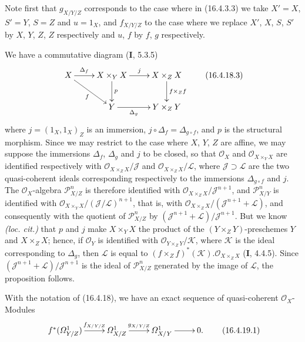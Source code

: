 Note first that $g_{X/Y/Z}$ corresponds to the case where in (16.4.3.3) we take
$X'=X$, $S'=Y$, $S=Z$ and $u=1_X$, and $f_{X/Y/Z}$ to the case where we replace
$X'$, $X$, $S$, $S'$ by $X$, $Y$, $Z$, $Z$ respectively and $u$, $f$ by
$f$, $g$ respectively.

We have a commutative diagram (\textbf{I}, 5.3.5)
\[
  \xymatrix{
    X\ar[r]^-{\Delta_f}\ar[dr]_-f
      &X\times_Y X\ar[d]^-p\ar[r]^-j
      &X\times_Z X\ar[d]^-{f\times_Z f}\\
    &Y\ar[r]_-{\Delta_g}&Y\times_Z Y
  }
  \tag{16.4.18.3}
  \label{IV.16.4.18.3}
\]
where $j=(1_X,1_X)_Z$ is an immersion, $j\circ\Delta_f=\Delta_{g\circ f}$, and
$p$ is the structural morphism. Since we may restrict to the case where $X$, $Y$,
$Z$ are affine, we may suppose the immersions $\Delta_f$, $\Delta_g$ and
$j$ to be closed, so that $\mathcal{O}_X$ and
$\mathcal{O}_{X\times_Y X}$ are identified respectively with
$\mathcal{O}_{X\times_Z X}/\mathscr{J}$ and
$\mathcal{O}_{X\times_Z X}/\mathscr{L}$, where
$\mathscr{J}\supset\mathscr{L}$ are the two quasi-coherent ideals
corresponding respectively to the immersions $\Delta_{g\circ f}$ and $j$. The
$\mathcal{O}_X$-algebra $\mathscr{P}_{X/Z}^n$ is therefore identified with
$\mathcal{O}_{X\times_Z X}/\mathscr{J}^{n+1}$, and
$\mathscr{P}_{X/Y}^n$ is identified with
$\mathcal{O}_{X\times_Y X}/(\mathscr{J}/\mathscr{L})^{n+1}$, that is, with
$\mathcal{O}_{X\times_Z X}/(\mathscr{J}^{n+1}+\mathscr{L})$, and consequently
with the quotient of $\mathscr{P}_{X/Z}^n$ by
$(\mathscr{J}^{n+1}+\mathscr{L})/\mathscr{J}^{n+1}$. But we know
\emph{(loc. cit.)} that $p$ and $j$ make $X\times_Y X$ the product of the
$(Y\times_Z Y)$-preschemes $Y$ and $X\times_Z X$; hence, if $\mathcal{O}_Y$ is
identified with $\mathcal{O}_{Y\times_Z Y}/\mathscr{K}$, where $\mathscr{K}$ is
the ideal corresponding to $\Delta_g$, then $\mathscr{L}$ is equal to
$(f\times_Z f)^*(\mathscr{K}).\mathcal{O}_{X\times_Z X}$ (\textbf{I}, 4.4.5).
Since $(\mathscr{J}^{n+1}+\mathscr{L})/\mathscr{J}^{n+1}$ is the ideal of
$\mathscr{P}_{X/Z}^n$ generated by the image of $\mathscr{L}$, the
proposition follows.

\begin{corollary}[16.4.19]
\label{IV.16.4.19}
With the notation of \textup{(16.4.18)}, we have an exact sequence of quasi-coherent
$\mathcal{O}_X$-Modules
\[
  \xymatrix{
    f^*(\varOmega_{Y/Z}^1)\ar[r]^-{f_{X/Y/Z}}&
    \varOmega_{X/Z}^1\ar[r]^-{g_{X/Y/Z}}&
    \varOmega_{X/Y}^1\ar[r]&0.
  }
  \tag{16.4.19.1}
  \label{IV.16.4.19.1}
\]
\end{corollary}

